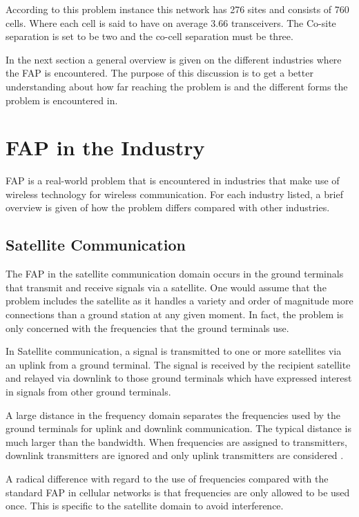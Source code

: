 According to this problem instance this network has 276 sites and consists of 760 cells. Where each cell is said to have on average 3.66 transceivers. The Co-site separation is set to be two and the co-cell separation must be three.

In the next section a general overview is given on the different industries where the \gls{FAP} is encountered. The purpose of this discussion is to get a better understanding about how far reaching the problem is and the different forms the problem is encountered in.
\section{FAP in the Industry}
\label{sec:FAPIndustry}
FAP is a real-world problem that is encountered in industries that make use of wireless technology for wireless communication\cite{Karen2004}. For each industry listed, a brief overview is given of how the problem differs compared with other industries. 

\subsection{Satellite Communication}
The \gls{FAP} in the satellite communication domain occurs in the ground terminals that transmit and receive signals via a satellite\cite{Karen2004}. One would assume that the problem includes the satellite as it handles a variety and order of magnitude more connections than a ground station at any given moment. In fact, the problem is only concerned with the frequencies that the ground terminals use\cite{Karen2004}.

In Satellite communication, a signal is transmitted to one or more satellites via an uplink from a ground terminal\cite{Karen2004}. The signal is received by the recipient satellite and relayed via downlink to those ground terminals which have expressed interest in signals from other ground terminals\cite{Karen2004}.

 A large distance in the frequency domain separates the frequencies used by the ground terminals for uplink and downlink communication. The typical distance is much larger than the bandwidth. When frequencies are assigned to transmitters, downlink transmitters are ignored and only uplink transmitters are considered \cite{Karen2004}. 

A radical difference with regard to the use of frequencies compared with the standard \gls{FAP} in cellular networks is that frequencies are only allowed to be used once\cite{Karen2004}. This is specific to the satellite domain to avoid interference\cite{Karen2004}.

